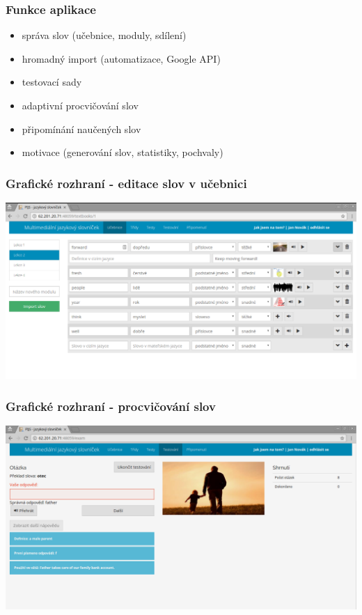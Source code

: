 \begin{frame}[t]
    \frametitle{Funkce aplikace}
    \begin{itemize}[<+->]
        \item správa slov (učebnice, moduly, sdílení)
        \item hromadný import (automatizace, Google API)
        \item testovací sady
        \item adaptivní procvičování slov
        \item připomínání naučených slov
        \item motivace (generování slov, statistiky, pochvaly)
    \end{itemize}
\end{frame}

\begin{frame}[t]
    \frametitle{Grafické rozhraní - editace slov v učebnici}
    \begin{center}
        \includegraphics[width=\textwidth]{./img/gui-textbook-editor.png}\\
    \end{center}
\end{frame}

\begin{frame}[t]
    \frametitle{Grafické rozhraní - procvičování slov}
    \begin{center}
        \includegraphics[width=\textwidth]{./img/gui-testing.png}\\
    \end{center}
\end{frame}

